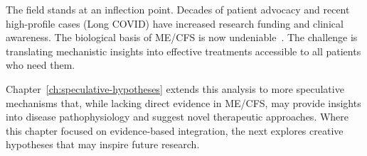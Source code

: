 The field stands at an inflection point. Decades of patient advocacy and recent high-profile cases (Long COVID) have increased research funding and clinical awareness. The biological basis of ME/CFS is now undeniable~\cite{walitt2024deep,heng2025mecfs,Fluge2025daratumumab}. The challenge is translating mechanistic insights into effective treatments accessible to all patients who need them.

\vspace{1em}

\noindent Chapter~\ref{ch:speculative-hypotheses} extends this analysis to more speculative mechanisms that, while lacking direct evidence in ME/CFS, may provide insights into disease pathophysiology and suggest novel therapeutic approaches. Where this chapter focused on evidence-based integration, the next explores creative hypotheses that may inspire future research.

